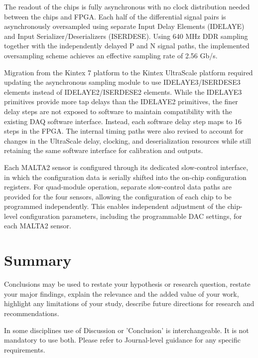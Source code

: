 \documentclass[pdftex,twocolumn,epjc3]{svjour3}          %
\begin{document}
The readout of the chips is fully asynchronous with no clock distribution needed between the chips and FPGA. Each half of the differential signal pairs is asynchronously oversampled using separate Input Delay Elements (IDELAYE) and Input Serializer/Deserializers (ISERDESE). Using 640 MHz DDR sampling together with the independently delayed P and N signal paths, the implemented oversampling scheme achieves an effective sampling rate of 2.56 Gb/s.

Migration from the Kintex 7 platform to the Kintex UltraScale platform required updating the asynchronous sampling module to use IDELAYE3/ISERDESE3 elements instead of IDELAYE2/ISERDESE2 elements. While the IDELAYE3 primitives provide more tap delays than the IDELAYE2 primitives, the finer delay steps are not exposed to software to maintain compatibility with the existing DAQ software interface. Instead, each software delay step maps to 16 steps in the FPGA. The internal timing paths were also revised to account for changes in the UltraScale delay, clocking, and deserialization resources while still retaining the same software interface for calibration and outputs.

Each MALTA2 sensor is configured through its dedicated slow-control interface, in which the configuration data is serially shifted into the on-chip configuration registers. For quad-module operation, separate slow-control data paths are provided for the four sensors, allowing the configuration of each chip to be programmed independently. This enables independent adjustment of the chip-level configuration parameters, including the programmable DAC settings, for each MALTA2 sensor.



\section{Summary}\label{sec:sum}

Conclusions may be used to restate your hypothesis or research question, restate your major findings, explain the relevance and the added value of your work, highlight any limitations of your study, describe future directions for research and recommendations. 

In some disciplines use of Discussion or 'Conclusion' is interchangeable. It is not mandatory to use both. Please refer to Journal-level guidance for any specific requirements. 
\end{document}
